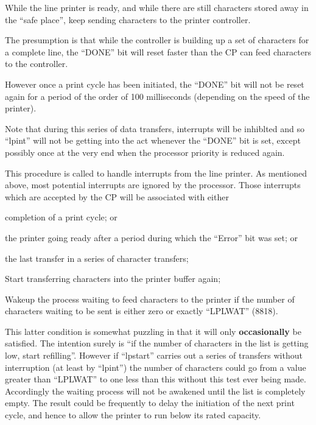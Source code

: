 
While the line printer is ready, and
while there are still characters stored
away in the ``safe place'', keep sending
characters to the printer controller.

The presumption is that while the controller
is building up a set of characters for a complete line, the ``DONE''
bit will reset faster than the CP can
feed characters to the controller.

However once a print cycle has been
initiated, the ``DONE'' bit will not be
reset again for a period of the order
of 100 milliseconds (depending on the
speed of the printer).

Note that during this series of data
transfers, interrupts will be inhiblted
and so ``lpint'' will not be getting into
the act whenever the ``DONE'' bit is set,
except possibly once at the very end
when the processor priority is reduced
again.


This procedure is called to handle
interrupts from the line printer. As
mentioned above, most potential interrupts are ignored by the processor.
Those interrupts which are accepted by
the CP will be associated with either

\bd
\item[(a)] completion of a print cycle; or

\item[(b)] the printer going ready after a
period during which the ``Error''
bit was set; or

\item[(c)] the last transfer in a series of
	character transfers;
\ed

\bd
\item[8980:] Start transferring characters
into the printer buffer again;

\item[8981:] Wakeup the process waiting to
feed characters to the printer if
the number of characters waiting
to be sent is either zero or
exactly ``LPLWAT'' (8818).
\ed

This latter condition is somewhat puzzling
in that it will only {\bf occasionally}
be satisfied. The intention surely is
``if the number of characters in the
list is getting low, start refilling''.
However if ``lpstart'' carries out a
series of transfers without interruption (at least by ``lpint'') the number
of characters could go from a value
greater than ``LPLWAT'' to one less than
this without this test ever being made.
Accordingly the waiting process will
not be awakened until the list is completely empty.
The result could be frequently to delay the initiation of the
next print cycle, and hence to allow
the printer to run below its rated
capacity.

